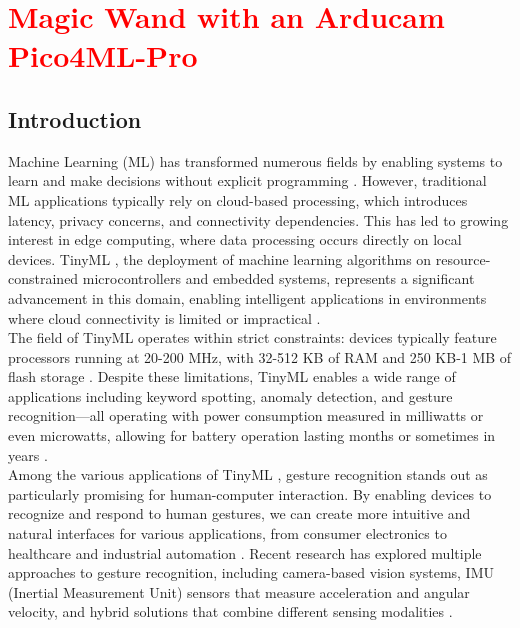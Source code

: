 %
%





\chapter{\textcolor{red}{Magic Wand with an Arducam Pico4ML-Pro}}



\section{Introduction}





Machine Learning (ML)  has transformed numerous fields by enabling systems to learn and make decisions without explicit programming \cite{Warden:2020}. However, traditional ML applications typically rely on cloud-based processing, which introduces latency, privacy concerns, and connectivity dependencies. This has led to growing interest in edge computing, where data processing occurs directly on local devices. TinyML , the deployment of machine learning algorithms on resource-constrained microcontrollers and embedded systems, represents a significant advancement in this domain, enabling intelligent applications in environments where cloud connectivity is limited or impractical \cite{Lin:2023}.\\



The field of TinyML operates within strict constraints: devices typically feature processors running at 20-200 MHz, with 32-512 KB of RAM and 250 KB-1 MB of flash storage \cite{Banbury:2020}. Despite these limitations, TinyML enables a wide range of applications including keyword spotting, anomaly detection, and gesture recognition—all operating with power consumption measured in milliwatts or even microwatts, allowing for battery operation lasting months or sometimes in years \cite{Kumar:2022}.\\



Among the various applications of TinyML , gesture recognition stands out as particularly promising for human-computer interaction. By enabling devices to recognize and respond to human gestures, we can create more intuitive and natural interfaces for various applications, from consumer electronics to healthcare and industrial automation \cite{Zhang:2021}. Recent research has explored multiple approaches to gesture recognition, including camera-based vision systems, IMU (Inertial Measurement Unit)  sensors that measure acceleration and angular velocity, and hybrid solutions that combine different sensing modalities \cite{Mathworks:2023,Bistrov:2012}.\\



